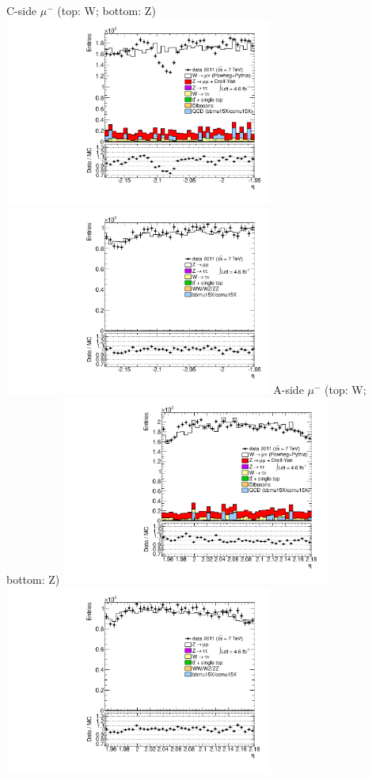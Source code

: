  {
\colb[T]
C-side $\mu^{-}$ (top: W; bottom: Z)
\centering
\includegraphics[width=0.66\textwidth]{dates/20130306/figures/etaphi/WlQ4_10_C_stack_l_eta_NEG} \\
\includegraphics[width=0.66\textwidth]{dates/20130306/figures/etaphi/Z_10_C_stack_lN_eta_ALL.pdf}
A-side $\mu^{-}$ (top: W; bottom: Z)
\centering
\includegraphics[width=0.66\textwidth]{dates/20130306/figures/etaphi/WlQ4_10_A_stack_l_eta_NEG} \\
\includegraphics[width=0.66\textwidth]{dates/20130306/figures/etaphi/Z_10_A_stack_lN_eta_ALL.pdf} 
\cole
}


